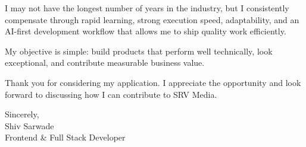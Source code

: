\documentclass[11pt,a4paper]{letter}
\newcommand{\mypar}{\vspace{1em}\noindent}
\begin{document}
\begin{flushleft}
I may not have the longest number of years in the industry, but I consistently compensate through rapid learning, strong execution speed, adaptability, and an AI-first development workflow that allows me to ship quality work efficiently.\mypar

My objective is simple: build products that perform well technically, look exceptional, and contribute measurable business value.\mypar

Thank you for considering my application. I appreciate the opportunity and look forward to discussing how I can contribute to SRV Media.\mypar

Sincerely,\\[1em]
Shiv Sarwade\\
Frontend \& Full Stack Developer

\end{flushleft}
\end{document}
